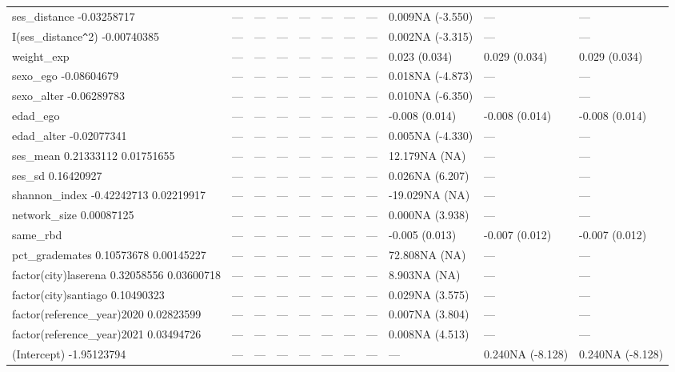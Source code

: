 \begin{table}[ht]
\begin{tabular}{lllllllllll}
  ses\_distance -0.03258717 & --- & --- & --- & --- & --- & --- & --- & 0.009NA (-3.550) & --- & --- \\ 
  I(ses\_distance\verb|^|2) -0.00740385 & --- & --- & --- & --- & --- & --- & --- & 0.002NA (-3.315) & --- & --- \\ 
  weight\_exp & --- & --- & --- & --- & --- & --- & --- & 0.023 (0.034) & 0.029 (0.034) & 0.029 (0.034) \\ 
  sexo\_ego -0.08604679 & --- & --- & --- & --- & --- & --- & --- & 0.018NA (-4.873) & --- & --- \\ 
  sexo\_alter -0.06289783 & --- & --- & --- & --- & --- & --- & --- & 0.010NA (-6.350) & --- & --- \\ 
  edad\_ego & --- & --- & --- & --- & --- & --- & --- & -0.008 (0.014) & -0.008 (0.014) & -0.008 (0.014) \\ 
  edad\_alter -0.02077341 & --- & --- & --- & --- & --- & --- & --- & 0.005NA (-4.330) & --- & --- \\ 
  ses\_mean 0.21333112 0.01751655 & --- & --- & --- & --- & --- & --- & --- & 12.179NA (NA) & --- & --- \\ 
  ses\_sd 0.16420927 & --- & --- & --- & --- & --- & --- & --- & 0.026NA (6.207) & --- & --- \\ 
  shannon\_index -0.42242713 0.02219917 & --- & --- & --- & --- & --- & --- & --- & -19.029NA (NA) & --- & --- \\ 
  network\_size 0.00087125 & --- & --- & --- & --- & --- & --- & --- & 0.000NA (3.938) & --- & --- \\ 
  same\_rbd & --- & --- & --- & --- & --- & --- & --- & -0.005 (0.013) & -0.007 (0.012) & -0.007 (0.012) \\ 
  pct\_grademates 0.10573678 0.00145227 & --- & --- & --- & --- & --- & --- & --- & 72.808NA (NA) & --- & --- \\ 
  factor(city)laserena 0.32058556 0.03600718 & --- & --- & --- & --- & --- & --- & --- & 8.903NA (NA) & --- & --- \\ 
  factor(city)santiago 0.10490323 & --- & --- & --- & --- & --- & --- & --- & 0.029NA (3.575) & --- & --- \\ 
  factor(reference\_year)2020 0.02823599 & --- & --- & --- & --- & --- & --- & --- & 0.007NA (3.804) & --- & --- \\ 
  factor(reference\_year)2021 0.03494726 & --- & --- & --- & --- & --- & --- & --- & 0.008NA (4.513) & --- & --- \\ 
  (Intercept) -1.95123794 & --- & --- & --- & --- & --- & --- & --- & --- & 0.240NA (-8.128) & 0.240NA (-8.128) \\ 

\end{tabular}
\end{table}
